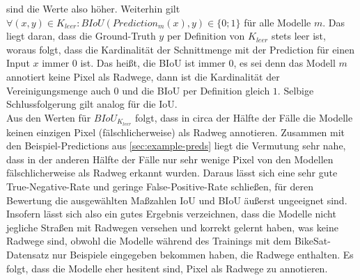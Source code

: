 sind die Werte also höher. Weiterhin gilt $\forall (x, y) \in K_{leer}: BIoU(Prediction_m(x), y) \in \{0; 1\}$ für alle Modelle $m$. 
Das liegt daran, dass die Ground-Truth $y$ per Definition von $K_{leer}$ stets leer ist, woraus folgt, dass die Kardinalität der 
Schnittmenge mit der Prediction für einen Input $x$ immer $0$ ist. Das heißt, die BIoU ist immer $0$, es sei denn 
das Modell $m$ annotiert keine Pixel als Radwege, dann ist die Kardinalität der Vereinigungsmenge auch $0$ und 
die BIoU per Definition gleich $1$. Selbige Schlussfolgerung gilt analog für die IoU. \\ 
Aus den Werten für $BIoU_{K_{leer}}$ folgt, dass in circa der Hälfte der Fälle die Modelle keinen einzigen Pixel 
(fälschlicherweise) als Radweg annotieren. Zusammen mit den Beispiel-Predictions aus \autoref{sec:example-preds} 
liegt die Vermutung sehr nahe, dass in der anderen Hälfte der Fälle nur sehr wenige Pixel von den Modellen 
fälschlicherweise als Radweg erkannt wurden. Daraus lässt sich eine sehr gute True-Negative-Rate und 
geringe False-Positive-Rate schließen, 
für deren Bewertung die ausgewählten Maßzahlen IoU und BIoU äußerst ungeeignet sind. Insofern lässt sich 
also ein gutes Ergebnis verzeichnen, dass die Modelle nicht jegliche Straßen mit Radwegen versehen und 
korrekt gelernt haben, was keine Radwege sind, obwohl die Modelle während des Trainings mit dem BikeSat-Datensatz 
nur Beispiele eingegeben bekommen haben, die Radwege enthalten. Es folgt, dass die Modelle eher hesitent sind,
Pixel als Radwege zu annotieren.  